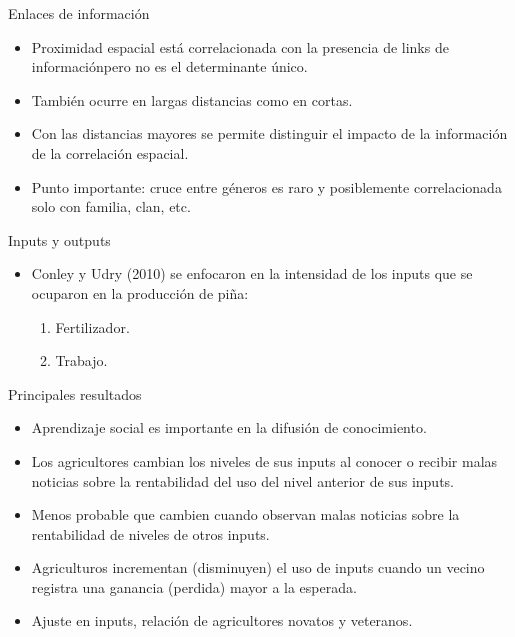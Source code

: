 \documentclass[11pt, aspectratio=169, compress]{beamer}
\begin{document}
\begin{frame}{Enlaces de información}
	\begin{itemize}
		\item Proximidad espacial está correlacionada con la presencia de links de informaciónpero no es el determinante único. 
		\item También ocurre en largas distancias como en cortas. 
		\item Con las distancias mayores se permite distinguir el impacto de la información de la correlación espacial. 
		\item Punto importante: cruce entre géneros es raro y posiblemente correlacionada solo con familia, clan, etc. 
	\end{itemize}
\end{frame}
\begin{frame}{Inputs y outputs}
	\begin{itemize}
		\item Conley y Udry (2010) se enfocaron en la intensidad de los inputs que se ocuparon en la producción de piña: 
		\begin{enumerate}
			\item Fertilizador. 
			\item Trabajo. 
		\end{enumerate}
	\end{itemize}
\end{frame}
\begin{frame}{Principales resultados}
	\begin{itemize}
		\item Aprendizaje social es importante en la difusión de conocimiento.
		\item Los agricultores cambian los niveles de sus inputs al conocer o recibir malas noticias sobre la rentabilidad del uso del nivel anterior de sus inputs.
		\item Menos probable que cambien cuando observan malas noticias sobre la rentabilidad de niveles de otros inputs.
		\item Agriculturos incrementan (disminuyen) el uso de inputs cuando un vecino registra una ganancia (perdida) mayor a la esperada. 
		\item Ajuste en inputs, relación de agricultores novatos y veteranos.
	\end{itemize}
\end{frame}
\end{document}
